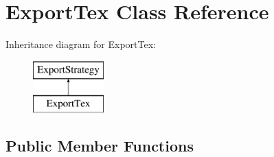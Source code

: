 \hypertarget{class_export_tex}{\section{Export\-Tex Class Reference}
\label{class_export_tex}
}
Inheritance diagram for Export\-Tex\-:\begin{figure}[H]
\begin{center}
\leavevmode
\includegraphics[height=2.000000cm]{class_export_tex}
\end{center}
\end{figure}
\subsection*{Public Member Functions}
